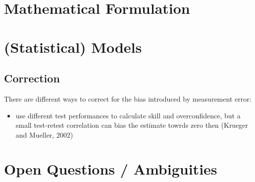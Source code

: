 \documentclass[a4paper,11pt]{article}
\newcommand{\1}{\mathbf{1}}
\begin{document}
\section{Mathematical Formulation}

\section{(Statistical) Models}

\subsection{Correction}
There are different ways to correct for the bias introduced by measurement error:
\begin{itemize}
 \item use different test performances to calculate skill and overconfidence, but a small test-retest correlation can bias the estimate towrds zero then (Krueger and Mueller, 2002)
\end{itemize}


\section{Open Questions / Ambiguities}
\end{document}

